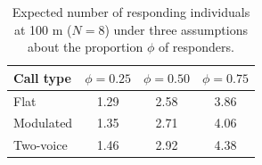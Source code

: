 \begin{table}[H]
\centering
\caption{Expected number of responding individuals at 100 m ($N=8$) under three assumptions about the proportion $\phi$ of responders.}
\label{tab:p4phi}
\small
\begin{tabular}{lccc}
\toprule
Call type & $\phi=0.25$ & $\phi=0.50$ & $\phi=0.75$ \\
\midrule
Flat & 1.29 & 2.58 & 3.86 \\
Modulated & 1.35 & 2.71 & 4.06 \\
Two-voice & 1.46 & 2.92 & 4.38 \\
\bottomrule
\end{tabular}
\end{table}